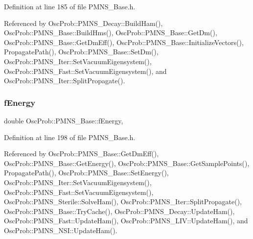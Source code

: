 Definition at line 185 of file P\+M\+N\+S\+\_\+\+Base.\+h.



Referenced by Osc\+Prob\+::\+P\+M\+N\+S\+\_\+\+Decay\+::\+Build\+Ham(), Osc\+Prob\+::\+P\+M\+N\+S\+\_\+\+Base\+::\+Build\+Hms(), Osc\+Prob\+::\+P\+M\+N\+S\+\_\+\+Base\+::\+Get\+Dm(), Osc\+Prob\+::\+P\+M\+N\+S\+\_\+\+Base\+::\+Get\+Dm\+Eff(), Osc\+Prob\+::\+P\+M\+N\+S\+\_\+\+Base\+::\+Initialize\+Vectors(), Propagate\+Path(), Osc\+Prob\+::\+P\+M\+N\+S\+\_\+\+Base\+::\+Set\+Dm(), Osc\+Prob\+::\+P\+M\+N\+S\+\_\+\+Iter\+::\+Set\+Vacuum\+Eigensystem(), Osc\+Prob\+::\+P\+M\+N\+S\+\_\+\+Fast\+::\+Set\+Vacuum\+Eigensystem(), and Osc\+Prob\+::\+P\+M\+N\+S\+\_\+\+Iter\+::\+Split\+Propagate().

\mbox{\label{classOscProb_1_1PMNS__Base_a2800af6d436972f3e900867790c046b0}} 
\subsubsection{\texorpdfstring{f\+Energy}{fEnergy}}
{\footnotesize\ttfamily double Osc\+Prob\+::\+P\+M\+N\+S\+\_\+\+Base\+::f\+Energy\hspace{0.3cm}{\ttfamily [protected]}, {\ttfamily [inherited]}}



Definition at line 198 of file P\+M\+N\+S\+\_\+\+Base.\+h.



Referenced by Osc\+Prob\+::\+P\+M\+N\+S\+\_\+\+Base\+::\+Get\+Dm\+Eff(), Osc\+Prob\+::\+P\+M\+N\+S\+\_\+\+Base\+::\+Get\+Energy(), Osc\+Prob\+::\+P\+M\+N\+S\+\_\+\+Base\+::\+Get\+Sample\+Points(), Propagate\+Path(), Osc\+Prob\+::\+P\+M\+N\+S\+\_\+\+Base\+::\+Set\+Energy(), Osc\+Prob\+::\+P\+M\+N\+S\+\_\+\+Iter\+::\+Set\+Vacuum\+Eigensystem(), Osc\+Prob\+::\+P\+M\+N\+S\+\_\+\+Fast\+::\+Set\+Vacuum\+Eigensystem(), Osc\+Prob\+::\+P\+M\+N\+S\+\_\+\+Sterile\+::\+Solve\+Ham(), Osc\+Prob\+::\+P\+M\+N\+S\+\_\+\+Iter\+::\+Split\+Propagate(), Osc\+Prob\+::\+P\+M\+N\+S\+\_\+\+Base\+::\+Try\+Cache(), Osc\+Prob\+::\+P\+M\+N\+S\+\_\+\+Decay\+::\+Update\+Ham(), Osc\+Prob\+::\+P\+M\+N\+S\+\_\+\+Fast\+::\+Update\+Ham(), Osc\+Prob\+::\+P\+M\+N\+S\+\_\+\+L\+I\+V\+::\+Update\+Ham(), and Osc\+Prob\+::\+P\+M\+N\+S\+\_\+\+N\+S\+I\+::\+Update\+Ham().

